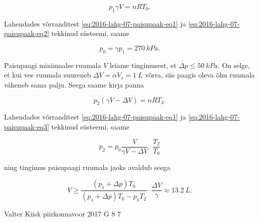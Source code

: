 \documentclass[11pt]{article}
\begin{document}
{{\begin{equation}
p_{1}\gamma V=nRT_{0}.\label{eq:2016-lahg-07-paisupaak-eq2}
\end{equation}


\noindent Lahendades võrranditest \eqref{eq:2016-lahg-07-paisupaak-eq1} ja \eqref{eq:2016-lahg-07-paisupaak-eq2} tekkinud süsteemi, saame

\[
p_{0}=\gamma p_{1}=\SI{270}{kPa}.
\]


\noindent Paisupaagi minimaalse ruumala $V$ leiame tingimusest, et
$\Delta p\leq\SI{50}{kPa}.$ On selge, et kui vee ruumala suureneb
$\Delta V=\alpha V_{s}=\SI{1}{L}$ võrra, siis paagis oleva õhu ruumala
väheneb sama palju. Seega saame kirja panna

\begin{equation}
p_{2}\left(\gamma V-\Delta V\right)=nRT_{2}.\label{eq:2016-lahg-07-paisupaak-eq3}
\end{equation}


\noindent Lahendades võrranditest \eqref{eq:2016-lahg-07-paisupaak-eq1} ja \eqref{eq:2016-lahg-07-paisupaak-eq3}
tekkinud süsteemi, saame

\[
p_{2}=p_{0}\frac{V}{\gamma V-\Delta V}\cdot\frac{T_{2}}{T_{0}}
\]


\noindent ning tingimus paisupaagi ruumala jaoks avaldub seega

\[
V\geq\frac{\left(p_{1}+\Delta p\right)T_{0}}{\left(p_{1}+\Delta p\right)T_{0}-p_{1}T_{2}}\cdot\frac{\Delta V}{\gamma}\approx\SI{13.2}{L}.
\]
\fi
}

{Valter Kiisk} %
{piirkonnavoor} %
{2017} %
{G 8} %
{7} %
{

}}
\end{document}
